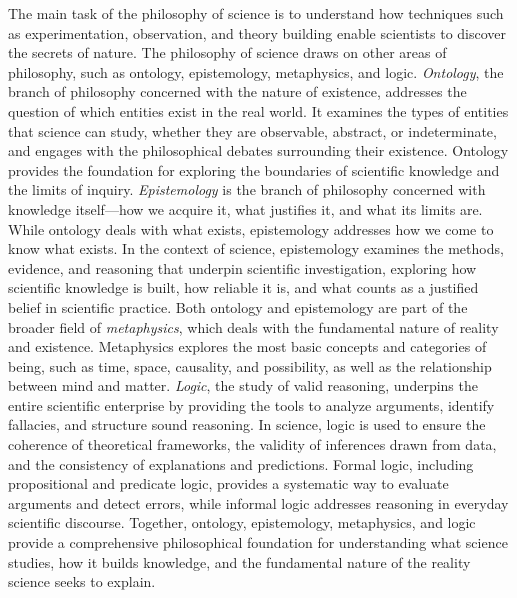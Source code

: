 The main task of the philosophy of science is to understand how techniques such as experimentation, observation, and theory building enable scientists to discover the secrets of nature. The philosophy of science draws on other areas of philosophy, such as ontology, epistemology, metaphysics, and logic. \emph{Ontology}, the branch of philosophy concerned with the nature of existence, addresses the question of which entities exist in the real world. It examines the types of entities that science can study, whether they are observable, abstract, or indeterminate, and engages with the philosophical debates surrounding their existence. Ontology provides the foundation for exploring the boundaries of scientific knowledge and the limits of inquiry. \emph{Epistemology} is the branch of philosophy concerned with knowledge itself—how we acquire it, what justifies it, and what its limits are. While ontology deals with what exists, epistemology addresses how we come to know what exists. In the context of science, epistemology examines the methods, evidence, and reasoning that underpin scientific investigation, exploring how scientific knowledge is built, how reliable it is, and what counts as a justified belief in scientific practice. Both ontology and epistemology are part of the broader field of \emph{metaphysics}, which deals with the fundamental nature of reality and existence. Metaphysics explores the most basic concepts and categories of being, such as time, space, causality, and possibility, as well as the relationship between mind and matter. \emph{Logic}, the study of valid reasoning, underpins the entire scientific enterprise by providing the tools to analyze arguments, identify fallacies, and structure sound reasoning. In science, logic is used to ensure the coherence of theoretical frameworks, the validity of inferences drawn from data, and the consistency of explanations and predictions. Formal logic, including propositional and predicate logic, provides a systematic way to evaluate arguments and detect errors, while informal logic addresses reasoning in everyday scientific discourse. Together, ontology, epistemology, metaphysics, and logic provide a comprehensive philosophical foundation for understanding what science studies, how it builds knowledge, and the fundamental nature of the reality science seeks to explain.


